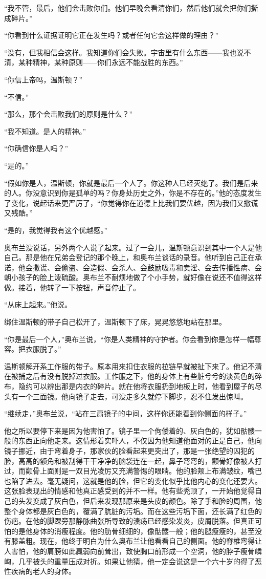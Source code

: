 ``我不管，最后，他们会击败你们。他们早晚会看清你们，然后他们就会把你们撕成碎片。''

``你看到什么证据证明它正在发生吗？或者任何它会这样做的理由？''

``没有，但我相信会这样。我知道你们会失败。宇宙里有什么东西——我也说不清，某种精神，某种原则——你们永远不能战胜的东西。''

``你信上帝吗，温斯顿？''

``不信。''

``那么，那个会击败我们的原则是什么？''

``我不知道。是人的精神。''

``你确信你是人吗？''

``是的。''

``假如你是人，温斯顿，你就是最后一个人了。你这种人已经灭绝了。我们是后来的人。你没意识到你是孤单的吗？你身处历史之外，你是不存在的。''他的态度发生了变化，说起话来更严厉了，``你觉得你在道德上比我们要优越，因为我们又撒谎又残酷。''

``是的，我觉得我有这个优越感。''

奥布兰没说话，另外两个人说了起来。过了一会儿，温斯顿意识到其中一个人是他自己。那是他在兄弟会登记的那个晚上，和奥布兰谈话的录音。他听到自己正在承诺，他会撒谎、会偷盗、会造假、会杀人、会鼓励吸毒和卖淫、会去传播性病、会朝小孩子的脸上泼硫酸。奥布兰不耐烦地做了个小手势，就好像在说还不值得这样做。接着，他转了一下按钮，声音停止了。

``从床上起来。''他说。

绑住温斯顿的带子自己松开了，温斯顿下了床，晃晃悠悠地站在那里。

``你是最后一个人，''奥布兰说，``你是人类精神的守护者。你会看到你是怎样一幅尊容。把衣服脱了。''

温斯顿解开系工作服的带子。原本用来扣住衣服的拉链早就被扯下来了。他记不清在被捕之后有没有脱掉过衣服。工作服之下，他的身体上有些脏兮兮的淡黄色的碎布，隐约可以辨出那是内衣的碎片。就在他将衣服扔到地板上时，他看到屋子的尽头有一个三面镜。他向镜子走去，可没走多久就停下脚步，忍不住发出惊叫。

``继续走，''奥布兰说，``站在三扇镜子的中间，这样你还能看到你侧面的样子。''

他之所以要停下来是因为他害怕了。镜子里一个佝偻着的、灰白色的，犹如骷髅一般的东西正向他走来。这情形着实吓人，不仅因为他知道他面对的正是自己，他向镜子挪近，由于弯着身子，那家伙的脸看起来更突出了，那是一张绝望的囚犯的脸，高高的额角和被刮得干干净净的脑袋连在一起，鼻子弯弯的，颧骨好像被人打过，而颧骨上面则是一双目光凌厉又充满警惕的眼睛。他的脸颊上布满皱纹，嘴巴也陷了进去。毫无疑问，这就是他的脸，但它的变化似乎比他内心的变化还要大。这张脸表现出的情感和他真正感受到的并不一样。他有些秃顶了，一开始他觉得自己的头发变成了灰白色，但后来发现那原来是头皮的颜色。除了手和脸的周围，他整个身体都是灰白色的，覆满了肮脏的污垢。而在这些污垢下面，还长满了红色的伤疤。在他的脚踝旁那静脉曲张所导致的溃疡已经感染发炎，皮屑脱落。但真正可怕的是他身体的消瘦程度。他的肋骨细细的，像骷髅一般；他的腿瘦瘦的，甚至没有膝盖粗。现在，他终于明白为什么奥布兰让他看看自己的侧面。他的脊椎弯得让人害怕，他的肩膀如此羸弱向前耸出，致使胸口前形成一个空洞，他的脖子瘦骨嶙峋，几乎被头的重量压成对折。如果让他猜，他一定会说这是一个六十岁的得了恶性疾病的老人的身体。

